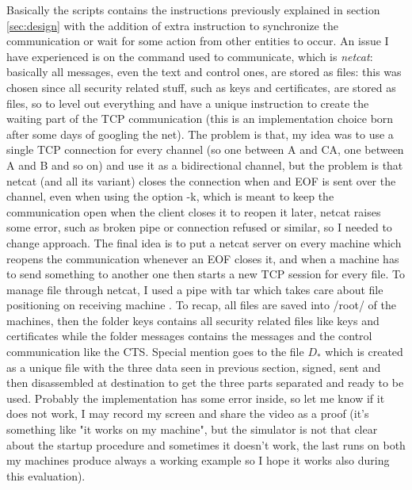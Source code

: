 \documentclass{article}
\begin{document}
Basically the scripts contains the instructions previously explained in section \ref{sec:design} with the addition of extra instruction to synchronize the communication or wait for some action from other entities to occur. An issue I have experienced is on the command used to communicate, which is \textit{netcat}: basically all messages, even the text and control ones, are stored as files: this was chosen since all security related stuff, such as keys and certificates, are stored as files, so to level out everything and have a unique instruction to create the waiting part of the TCP communication (this is an implementation choice born after some days of googling the net). The problem is that, my idea was to use a single TCP connection for every channel (so one between A and CA, one between A and B and so on) and use it as a bidirectional channel, but the problem is that netcat (and all its variant) closes the connection when and EOF is sent over the channel, even when using the option -k, which is meant to keep the communication open when the client closes it to reopen it later, netcat raises some error, such as broken pipe or connection refused or similar, so I needed to change approach. The final idea is to put a netcat server on every machine which reopens the communication whenever an EOF closes it, and when a machine has to send something to another one then starts a new TCP session for every file. To manage file through netcat, I used a pipe with tar which takes care about file positioning on receiving machine \cite{nc_multiple}.\newline
To recap, all files are saved into /root/ of the machines, then the folder keys contains all security related files like keys and certificates while the folder messages contains the messages and the control communication like the CTS. Special mention goes to the file $D_*$ which is created as a unique file with the three data seen in previous section, signed, sent and then disassembled at destination to get the three parts separated and ready to be used.\newline
Probably the implementation has some error inside, so let me know if it does not work, I may record my screen and share the video as a proof (it's something like "it works on my machine", but the simulator is not that clear about the startup procedure and sometimes it doesn't work, the last runs on both my machines produce always a working example so I hope it works also during this evaluation).

\end{document}
